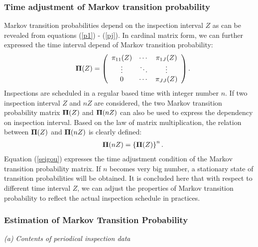 \subsubsection{Time adjustment of Markov transition probability}
\label{2412}
Markov transition probabilities depend on the inspection interval $Z$ as can be revealed from equations (\ref{p1}) - (\ref{pj}). In cardinal matrix form, we can further expressed the time interval depend of Markov transition probability:
\begin{eqnarray}
&& \mbox{\boldmath$\Pi$}(Z)=\left(
\begin{array}{ccc}
\pi_{11}(Z) & \cdots & \pi_{1J}(Z) \\
\vdots & \ddots & \vdots \\
0 & \cdots  & \pi_{JJ}(Z)
\end{array}
\right).
\end{eqnarray}
Inspections are scheduled in a regular based time with integer number $n$. If two inspection interval $Z$ and $nZ$ are considered, the two Markov transition probability matrix $\mbox{\boldmath$\Pi$} (Z) $ and $\mbox{\boldmath$\Pi$} (nZ) $ can also be used to express the dependency on inspection interval. Based on the law of matrix multiplication, the relation between $\mbox{\boldmath$\Pi$} (Z) $ and $\mbox{\boldmath$\Pi$} (nZ) $ is clearly defined:
\begin{eqnarray}
&& \mbox{\boldmath$\Pi$}(nZ)=\left\{\mbox{\boldmath$\Pi$}(Z)\right\}^n .\label{seigou}
\end{eqnarray}
Equation (\ref{seigou}) expresses the time adjustment condition of the Markov transition probability matrix. If $n$ becomes very big number, a stationary state of transition probabilities will be obtained. It is concluded here that with respect to different time interval $Z$, we can adjust the properties of Markov transition probability to reflect the actual inspection schedule in practices.
\subsubsection{Estimation of Markov Transition Probability}
\label{2413}
\textit{(a) Contents of periodical inspection data}

